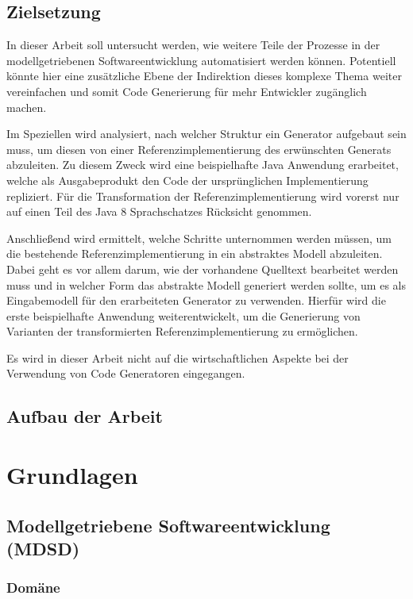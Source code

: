 \documentclass[12pt,oneside,a4paper,parskip]{scrbook}
\begin{document}
\section{Zielsetzung}

In dieser Arbeit soll untersucht werden, wie weitere Teile der Prozesse in der modellgetriebenen Softwareentwicklung automatisiert werden können. Potentiell könnte hier eine zusätzliche Ebene der Indirektion dieses komplexe Thema weiter vereinfachen und somit Code Generierung für mehr Entwickler zugänglich machen.

Im Speziellen wird analysiert, nach welcher Struktur ein Generator aufgebaut sein muss, um diesen von einer Referenzimplementierung des erwünschten Generats abzuleiten. Zu diesem Zweck wird eine beispielhafte Java Anwendung erarbeitet, welche als Ausgabeprodukt den Code der ursprünglichen Implementierung repliziert. Für die Transformation der Referenzimplementierung wird vorerst nur auf einen Teil des Java 8 Sprachschatzes Rücksicht genommen.

Anschließend wird ermittelt, welche Schritte unternommen werden müssen, um die bestehende Referenzimplementierung in ein abstraktes Modell abzuleiten. Dabei geht es vor allem darum, wie der vorhandene Quelltext bearbeitet werden muss und in welcher Form das abstrakte Modell generiert werden sollte, um es als Eingabemodell für den erarbeiteten Generator zu verwenden. Hierfür wird die erste beispielhafte Anwendung weiterentwickelt, um die Generierung von Varianten der transformierten Referenzimplementierung zu ermöglichen.

Es wird in dieser Arbeit nicht auf die wirtschaftlichen Aspekte bei der Verwendung von Code Generatoren eingegangen.

\section{Aufbau der Arbeit}

\chapter{Grundlagen}

\section{Modellgetriebene Softwareentwicklung (MDSD)}

\subsection{Domäne}
\end{document}
